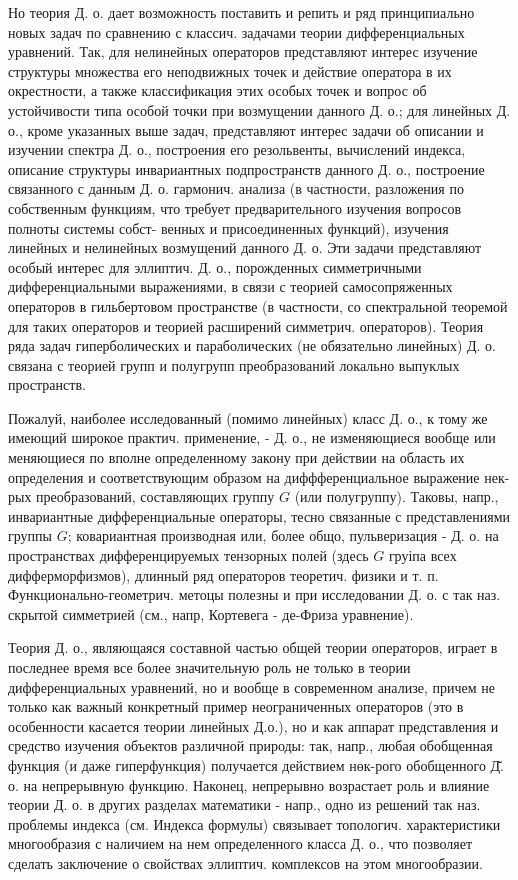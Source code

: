 \documentclass[10pt]{article}
\begin{document}
Но теория Д. о. дает возможность поставить и репить и ряд принципиально новых задач по сравнению с классич. задачами теории дифференциальных уравнений. Так, для нелинейных операторов представляют интерес изучение структуры множества его неподвижных точек и действие оператора в их окрестности, а также классификация этих особых точек и вопрос об устойчивости типа особой точки при возмущении данного Д. о.; для линейных Д. о., кроме указанных выше задач, представляют интерес задачи об описании и изучении спектра Д. о., построения его резольвенты, вычислений индекса, описание структуры инвариантных подпространств данного Д. о., построение связанного с данным Д. о. гармонич. анализа (в частности, разложения по собственным функциям, что требует предварительного изучения вопросов полноты системы собст- венных и присоединенных функций), изучения линейных и нелинейных возмущений данного Д. о. Эти задачи представляют особый интерес для эллиптич. Д. о., порожденных симметричными дифференциальными выражениями, в связи с теорией самосопряженных операторов в гильбертовом пространстве (в частности, со спектральной теоремой для таких операторов и теорией расширений симметрич. операторов). Теория ряда задач гиперболических и параболических (не обязательно линейных) Д. о. связана с теорией групп и полугрупп преобразований локально выпуклых пространств.



Пожалуй, наиболее исследованный (помимо линейных) класс Д. о., к тому же имеющий широкое практич. применение, - Д. о., не изменяющиеся вообще или меняющиеся по вполне определенному закону при действии на область их определения и соответствующим образом на диффференциальное выражение нек-рых преобразований, составляющих группу $G$ (или полугруппу). Таковы, напр., инвариантные дифференциальные операторы, тесно связанные с представлениями группы $G$; ковариантная производная или, более общо, пульверизация - Д. о. на пространствах дифференцируемых тензорных полей (здесь $G$ груіпа всех дифферморфизмов), длинный ряд операторов теоретич. физики и т. п. Функционально-геометрич. метоцы полезны и при исследовании Д. о. с так наз. скрытой симметрией (см., напр, Кортевега - де-Фриза уравнение).



Теория Д. о., являющаяся составной частью общей теории операторов, играет в последнее время все более значительную роль не только в теории дифференциальных уравнений, но и вообще в современном анализе, причем не только как важный конкретный пример неограниченных операторов (это в особенности касается теории линейных Д.о.), но и как аппарат представления и средство изучения объектов различной природы: так, напр., любая обобщенная функция (и даже гиперфункция) получается действием нөк-рого обобщенного Д̆. о. на непрерывную функцию. Наконец, непрерывно возрастает роль и влияние теории Д. о. в других разделах математики - напр., одно из решений так наз. проблемы индекса (см. Индекса формулы) связывает топологич. характеристики многообразия с наличием на нем определенного класса Д. о., что позволяет сделать заключение о свойствах эллиптич. комплексов на этом многообразии.
\end{document}

